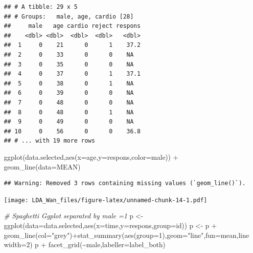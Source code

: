 \documentclass[
]{article}
\newenvironment{Shaded}{\begin{snugshade}}{\end{snugshade}}
\newcommand{\AttributeTok}[1]{\textcolor[rgb]{0.77,0.63,0.00}{#1}}
\newcommand{\CommentTok}[1]{\textcolor[rgb]{0.56,0.35,0.01}{\textit{#1}}}
\newcommand{\DecValTok}[1]{\textcolor[rgb]{0.00,0.00,0.81}{#1}}
\newcommand{\FunctionTok}[1]{\textcolor[rgb]{0.00,0.00,0.00}{#1}}
\newcommand{\NormalTok}[1]{#1}
\newcommand{\OtherTok}[1]{\textcolor[rgb]{0.56,0.35,0.01}{#1}}
\newcommand{\SpecialCharTok}[1]{\textcolor[rgb]{0.00,0.00,0.00}{#1}}
\newcommand{\StringTok}[1]{\textcolor[rgb]{0.31,0.60,0.02}{#1}}
\begin{document}
\begin{verbatim}
## # A tibble: 29 x 5
## # Groups:   male, age, cardio [28]
##     male   age cardio reject respons
##    <dbl> <dbl>  <dbl>  <dbl>   <dbl>
##  1     0    21      0      1    37.2
##  2     0    33      0      0    NA  
##  3     0    35      0      0    NA  
##  4     0    37      0      1    37.1
##  5     0    38      0      1    NA  
##  6     0    39      0      0    NA  
##  7     0    48      0      0    NA  
##  8     0    48      0      1    NA  
##  9     0    49      0      0    NA  
## 10     0    56      0      0    36.8
## # ... with 19 more rows
\end{verbatim}

\begin{Shaded}
\begin{Highlighting}[]
\FunctionTok{ggplot}\NormalTok{(data.selected,}\FunctionTok{aes}\NormalTok{(}\AttributeTok{x=}\NormalTok{age,}\AttributeTok{y=}\NormalTok{respons,}\AttributeTok{color=}\NormalTok{male)) }\SpecialCharTok{+} \FunctionTok{geom\_line}\NormalTok{(}\AttributeTok{data=}\NormalTok{MEAN)}
\end{Highlighting}
\end{Shaded}

\begin{verbatim}
## Warning: Removed 3 rows containing missing values (`geom_line()`).
\end{verbatim}

\texttt{[image: LDA\_Wan\_files/figure-latex/unnamed-chunk-14-1.pdf]}

\begin{Shaded}
\begin{Highlighting}[]
\CommentTok{\# Spaghetti Ggplot separated by male =1}
\NormalTok{p }\OtherTok{\textless{}{-}} \FunctionTok{ggplot}\NormalTok{(}\AttributeTok{data=}\NormalTok{data.selected,}\FunctionTok{aes}\NormalTok{(}\AttributeTok{x=}\NormalTok{time,}\AttributeTok{y=}\NormalTok{respons,}\AttributeTok{group=}\NormalTok{id))}
\NormalTok{p }\OtherTok{\textless{}{-}}\NormalTok{ p }\SpecialCharTok{+} \FunctionTok{geom\_line}\NormalTok{(}\AttributeTok{col=}\StringTok{"grey"}\NormalTok{)}\SpecialCharTok{+}\FunctionTok{stat\_summary}\NormalTok{(}\FunctionTok{aes}\NormalTok{(}\AttributeTok{group=}\DecValTok{1}\NormalTok{),}\AttributeTok{geom=}\StringTok{"line"}\NormalTok{,}\AttributeTok{fun=}\NormalTok{mean,}\AttributeTok{linewidth=}\DecValTok{2}\NormalTok{)}
\NormalTok{p }\SpecialCharTok{+} \FunctionTok{facet\_grid}\NormalTok{(}\SpecialCharTok{\textasciitilde{}}\NormalTok{male,}\AttributeTok{labeller=}\NormalTok{label\_both)}
\end{Highlighting}
\end{Shaded}
\end{document}
